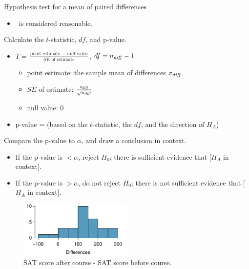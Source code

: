 \begin{onebox}{Hypothesis test for a mean of paired differences}
\begin{itemize}
\item[] \quad \ is considered reasonable.  
\end{itemize}
   Calculate the $t$-statistic, $df$, and p-value.
\begin{itemize}
\item[] $T = \frac{\text{point estimate } - \text{ null value}}{SE \text{ of estimate}}$,  \quad $df=n_{\text{\emph{diff}}} -1$
\begin{itemize}
\item[] point estimate: the sample mean of differences $\bar{x}_{\text{\emph{diff}}} $
\item[] $SE$ of estimate:  $\frac{s_{\text{\emph{diff}}} }{\sqrt{n_{\text{\emph{diff}}} }}$
\item[] null value: $0$
\end{itemize}
\item[] p-value = (based on the $t$-statistic, the $df$, and the direction of $H_A$)
\end{itemize}
  Compare the p-value to $\alpha$, and draw a conclusion in context.\vspace{-1mm}
\begin{itemize}
\item[] If the p-value is $< \alpha$, reject $H_0$; there is sufficient evidence that [$H_A$ in context]. 
\item[] If the p-value is $> \alpha$, do not reject $H_0$; there is not sufficient evidence that [$H_A$ in context].
\end{itemize}\end{onebox}



\begin{figure}[h]
\centering
\includegraphics[width=0.5\textwidth]{ch_inference_for_means/figures/satImprovementHTDataHistogram/satImprovementHTDataHistogram}
\caption{SAT score after course - SAT score before course. }
\label{satImprovementHTDataHistogramrepeat}
\end{figure}

